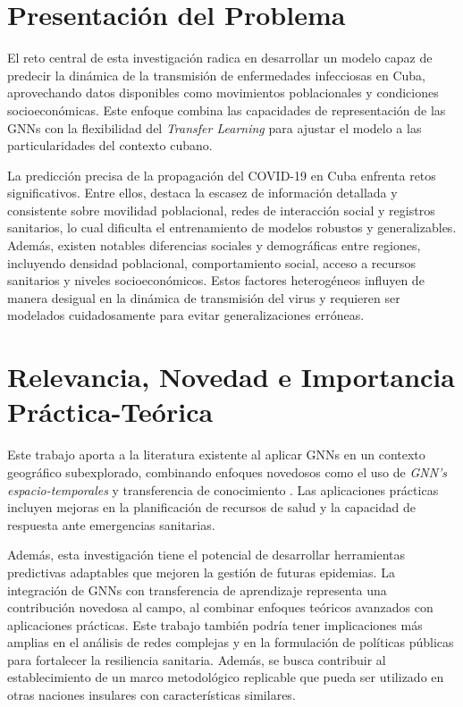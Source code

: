 \section*{Presentación del Problema}

El reto central de esta investigación radica en desarrollar un modelo capaz de predecir la dinámica de la transmisión de enfermedades infecciosas en Cuba, aprovechando datos disponibles como movimientos poblacionales y condiciones socioeconómicas. Este enfoque combina las capacidades de representación de las GNNs con la flexibilidad del \textit{Transfer Learning} para ajustar el modelo a las particularidades del contexto cubano.


La predicción precisa de la propagación del COVID-19 en Cuba enfrenta retos significativos. Entre ellos, destaca la escasez de información detallada y consistente sobre movilidad poblacional, redes de interacción social y registros sanitarios, lo cual dificulta el entrenamiento de modelos robustos y generalizables. Además, existen notables diferencias sociales y demográficas entre regiones, incluyendo densidad poblacional, comportamiento social, acceso a recursos sanitarios y niveles socioeconómicos. Estos factores heterogéneos influyen de manera desigual en la dinámica de transmisión del virus y requieren ser modelados cuidadosamente para evitar generalizaciones erróneas.


\section*{Relevancia, Novedad e Importancia Práctica-Teórica}

Este trabajo aporta a la literatura existente al aplicar GNNs en un contexto geográfico subexplorado, combinando enfoques novedosos como el uso de \textit{GNN's espacio-temporales} y transferencia de conocimiento \parencite{Nguyen2023NZSTGNN, Zheng2024HeatGNN}. Las aplicaciones prácticas incluyen mejoras en la planificación de recursos de salud y la capacidad de respuesta ante emergencias sanitarias.


Además, esta investigación tiene el potencial de desarrollar herramientas predictivas adaptables que mejoren la gestión de futuras epidemias. La integración de GNNs con transferencia de aprendizaje representa una contribución novedosa al campo, al combinar enfoques teóricos avanzados con aplicaciones prácticas. Este trabajo también podría tener implicaciones más amplias en el análisis de redes complejas y en la formulación de políticas públicas para fortalecer la resiliencia sanitaria. Además, se busca contribuir al establecimiento de un marco metodológico replicable que pueda ser utilizado en otras naciones insulares con características similares.


